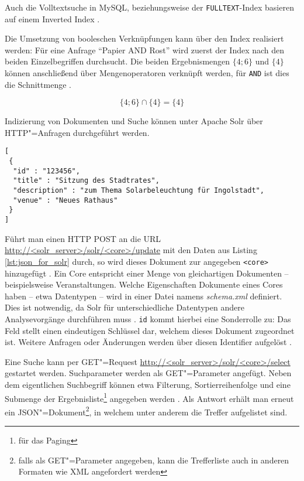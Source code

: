 Auch die Volltextsuche in MySQL, beziehungsweise der \texttt{FULLTEXT}-Index basieren auf einem Inverted Index \cite{OracleCorporationandoritsaffiliates.2015c}.

Die Umsetzung von booleschen Verknüpfungen kann über den Index realisiert werden: Für eine Anfrage \enquote{Papier AND Rost} wird zuerst der Index nach den beiden Einzelbegriffen durchsucht. Die beiden Ergebnismengen $\{4;6\}$ und $\{4\}$ können anschließend über Mengenoperatoren verknüpft werden, für \texttt{AND} ist dies die Schnittmenge \cite[S. 58]{Grainger.2014}.

\begin{equation}
	\{4;6\} \cap \{4\} = \{4\}
\end{equation}

Indizierung von Dokumenten und Suche können unter Apache Solr über HTTP"=Anfragen durchgeführt werden.


\begin{listing}
\begin{verbatim}
[
 {
  "id" : "123456",
  "title" : "Sitzung des Stadtrates",
  "description" : "zum Thema Solarbeleuchtung für Ingolstadt",
  "venue" : "Neues Rathaus"
 }
]
\end{verbatim}
\caption{JSON-Dokument für die Indizierung in Solr}
\label{lst:json_for_solr}
\end{listing}

Führt man einen HTTP POST an die URL \url{http://<solr_server>/solr/<core>/update} mit den Daten aus Listing \ref{lst:json_for_solr} durch, so wird dieses Dokument zur angegeben \texttt{<core>} hinzugefügt \cite[S. 142]{Grainger.2014}. Ein Core entspricht einer Menge von gleichartigen Dokumenten -- beispielsweise Veranstaltungen. Welche Eigenschaften Dokumente eines Cores haben -- etwa Datentypen -- wird in einer Datei namens \emph{schema.xml} definiert. Dies ist notwendig, da Solr für unterschiedliche Datentypen andere Analysevorgänge durchführen muss \cite[S. 125]{Grainger.2014}. \texttt{id} kommt hierbei eine Sonderrolle zu: Das Feld stellt einen eindeutigen Schlüssel dar, welchem dieses Dokument zugeordnet ist. Weitere Anfragen oder Änderungen werden über diesen Identifier aufgelöst \cite[S. 122f]{Grainger.2014}.

Eine Suche kann per GET"=Request \url{http://<solr_server>/solr/<core>/select} gestartet werden. Suchparameter werden als GET"=Parameter angefügt. Neben dem eigentlichen Suchbegriff können etwa Filterung, Sortierreihenfolge und eine Submenge der Ergebnisliste\footnote{für das Paging} angegeben werden \cite[S. 36f]{Grainger.2014}. Als Antwort erhält man erneut ein JSON"=Dokument\footnote{falls als GET"=Parameter angegeben, kann die Trefferliste auch in anderen Formaten wie XML angefordert werden}, in welchem unter anderem die Treffer aufgelistet sind.

